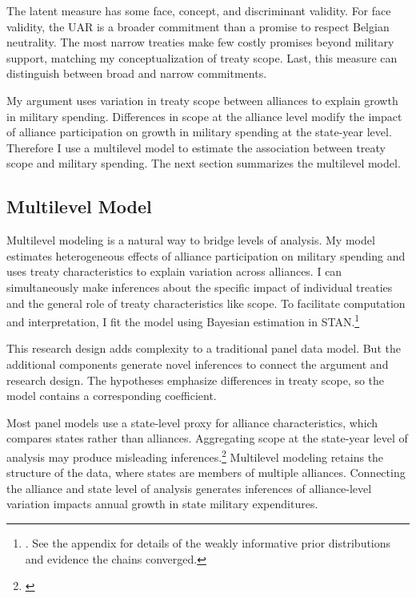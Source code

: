 \documentclass[12pt]{article}
\begin{document}
The latent measure has some face, concept, and discriminant validity. 
For face validity, the UAR is a broader commitment than a promise to respect Belgian neutrality. 
The most narrow treaties make few costly promises beyond military support, matching my conceptualization of treaty scope. 
Last, this measure can distinguish between broad and narrow commitments. 


My argument uses variation in treaty scope between alliances to explain growth in military spending.
Differences in scope at the alliance level modify the impact of alliance participation on growth in military spending at the state-year level. 
Therefore I use a multilevel model to estimate the association between treaty scope and military spending.  
The next section summarizes the multilevel model. 


\subsection{Multilevel Model} 


Multilevel modeling is a natural way to bridge levels of analysis.
My model estimates heterogeneous effects of alliance participation on military spending and uses treaty characteristics to explain variation across alliances. 
I can simultaneously make inferences about the specific impact of individual treaties and the general role of treaty characteristics like scope. 
To facilitate computation and interpretation, I fit the model using Bayesian estimation in STAN.\footnote{\cite{Carpenteretal2016}. See the appendix for details of the weakly informative prior distributions and evidence the chains converged.}


This research design adds complexity to a traditional panel data model. 
But the additional components generate novel inferences to connect the argument and research design. 
The hypotheses emphasize differences in treaty scope, so the model contains a corresponding coefficient.


Most panel models use a state-level proxy for alliance characteristics, which compares states rather than alliances.
Aggregating scope at the state-year level of analysis may produce misleading inferences.\footnote{\cite{McElreath2016}}
Multilevel modeling retains the structure of the data, where states are members of multiple alliances. 
Connecting the alliance and state level of analysis generates inferences of alliance-level variation impacts annual growth in state military expenditures. 
\end{document}
